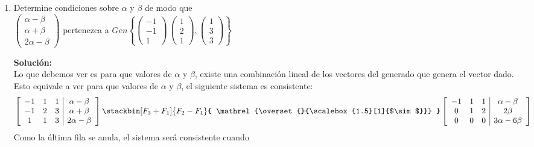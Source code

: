 \documentclass[12pt]{article}
\newenvironment{solucion}
{\begin{mdframed}[backgroundcolor=black!10]
		{\bf Solución:}\\
	}
	{
	\end{mdframed}
}
\newenvironment{preguntas}
{\begin{enumerate}\itemsep12pt
	}
	{
	\end{enumerate}
}
\newcommand{\ra}{\rightarrow}
\newcommand{\widesim}[2][1.5]{
	\mathrel{\overset{#2}{\scalebox{#1}[1]{$\sim$}}}
}
\newcommand{\wsim}{\widesim{}}
\begin{document}
\begin{preguntas}
\begin{solucion}
$$\begin{bmatrix}
	1 & -2 & h\\
	0 & 1 & 0\\
	0 & 3 & 2h-2
	\end{bmatrix} \sim 
	\begin{bmatrix}
	1 & -2 & h\\
	0 & 1 & 0\\
	0 & 0 & 2h-2
	\end{bmatrix}$$
	Luego, para que la matriz tenga 2 pivotes, debe ocurrir que
	$$2h-2 = 0 \ra h = 1$$
\end{solucion}
\item Determine condiciones sobre $\alpha$ y $\beta$ de modo que \\
	$\begin{pmatrix}
	\alpha-\beta\\
	\alpha + \beta\\
	2\alpha - \beta
	\end{pmatrix}$ pertenezca a $Gen\left\{\begin{pmatrix}
	-1\\
	-1\\
	1
	\end{pmatrix}\, \begin{pmatrix}
	1\\
	2\\
	1
	\end{pmatrix}, \begin{pmatrix}
	1\\
	3\\
	3
	\end{pmatrix}\right\}$
\begin{solucion}
Lo que debemos ver es para que valores de $\alpha$ y $\beta$, existe una combinación lineal de los vectores del generado que genera el vector dado. Esto equivale a ver para que valores de $\alpha$ y $\beta$, el siguiente sistema es consistente:
		$$
		\left[
		\begin{array}{ccc|c}
		-1 & 1 & 1 & \alpha - \beta\\
		-1 & 2 & 3 & \alpha + \beta\\
		1 & 1 & 3 & 2\alpha - \beta
		\end{array}
		\right] \stackbin[F_3+F_1]{F_2-F_1}{\wsim}
		\left[
		\begin{array}{ccc|c}
		-1 & 1 & 1 & \alpha - \beta\\
		0 & 1 & 2 & 2\beta\\
		0 & 0 & 0 & 3\alpha - 6\beta
		\end{array}	\right]$$
		Como la última fila se anula, el sistema será consistente cuando

\end{solucion}
\end{preguntas}
\end{document}
